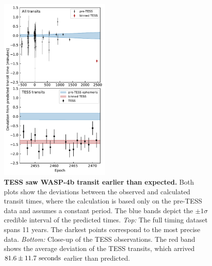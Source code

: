 \documentclass[12pt,twocolumn,tighten]{aastex62}
\begin{document}
\begin{figure}[t]
    \begin{center}
        \leavevmode
        \includegraphics[width=0.49\textwidth]{f3.pdf}
    \end{center}
    \vspace{-0.6cm}
    \caption{ {\bf TESS saw WASP-4b transit earlier than expected.}
      Both plots show the deviations between the observed and
      calculated transit times, where the calculation is based only on
      the pre-TESS data and assumes a constant period.  The blue bands
      depict the $\pm$$1\sigma$ credible interval of the predicted
      times.  {\it Top:} The full timing dataset spans 11 years. The
      darkest points correspond to the most precise data.  {\it
        Bottom:} Close-up of the TESS observations. The red band shows
      the average deviation of the TESS transits, which arrived $81.6 \pm
      11.7\ {\rm seconds}$ earlier than predicted.
        \label{fig:arrived_early}
    }
\end{figure}
\end{document}
